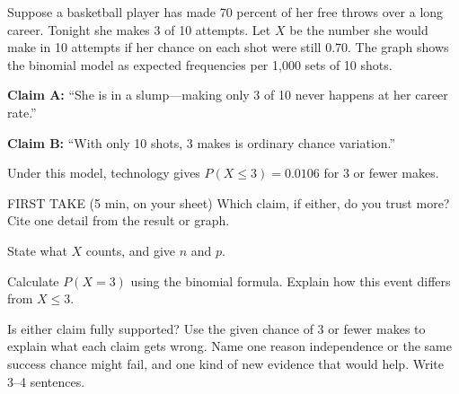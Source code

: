 \documentclass[14pt]{extarticle}
\begin{document}
\pagestyle{empty}


\noindent\begin{minipage}[t]{0.57\linewidth}
\vspace{0pt}
Suppose a basketball player has made 70 percent of her free throws over a long career. Tonight she makes 3 of 10 attempts. Let $X$ be the number she would make in 10 attempts if her chance on each shot were still 0.70. The graph shows the binomial model as expected frequencies per 1,000 sets of 10 shots.\par\smallskip \textbf{Claim A:} ``She is in a slump---making only 3 of 10 never happens at her career rate.''\par \textbf{Claim B:} ``With only 10 shots, 3 makes is ordinary chance variation.''\par Under this model, technology gives $P(X\leq3)=0.0106$ for 3 or fewer makes.\par
\end{minipage}\hfill
\begin{minipage}[t]{0.40\linewidth}
\vspace{0pt}
\begin{center}
\end{center}
\end{minipage}

\begin{firsttakebox}{FIRST TAKE (5 min, on your sheet)}
Which claim, if either, do you trust more? Cite one detail from the result or graph.
\end{firsttakebox}

\begin{description}[leftmargin=1.15in, labelwidth=1in, itemsep=2pt, topsep=2pt]
  \item[\dokbadge{1}~(a)] State what $X$ counts, and give $n$ and $p$.
  \item[\dokbadge{2}~(b)] Calculate $P(X=3)$ using the binomial formula. Explain how this event differs from $X\leq3$.
  \item[\dokbadge{3}~(c)] Is either claim fully supported? Use the given chance of 3 or fewer makes to explain what each claim gets wrong. Name one reason independence or the same success chance might fail, and one kind of new evidence that would help. Write 3--4 sentences.
\end{description}
\end{document}
